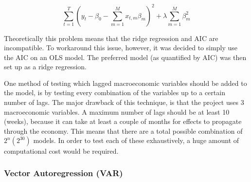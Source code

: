 \documentclass[11pt, a4paper]{article}
\begin{document}
\begin{equation}
\sum_{t=1}^{T}(y_{t}-\beta_{0}-\sum_{m=1}^{M}x_{t,m}\beta_{m})^2+\lambda\sum_{m=1}^{M}\beta^{2}_{m}
\end{equation}


Theoretically this problem means that the ridge regression and AIC are incompatible. To workaround this issue, however, it was decided to simply use the AIC on an OLS model. The preferred model (as quantified by AIC) was then set up as a ridge regression. 

One method of testing which lagged macroeconomic variables should be added to the model, is by testing every combination of the variables up to a certain number of lags. The major drawback of this technique, is that the project uses 3 macroeconomic variables. A maximum number of lags should be at least 10 (weeks), because it can take at least a couple of months for effects to propagate through the economy. This means that there are a total possible combination of $2^n (2^{30})$ models. In order to test each of these exhaustively, a huge amount of computational cost would be required. 

\subsubsection*{Vector Autoregression (VAR)}
\end{document}
